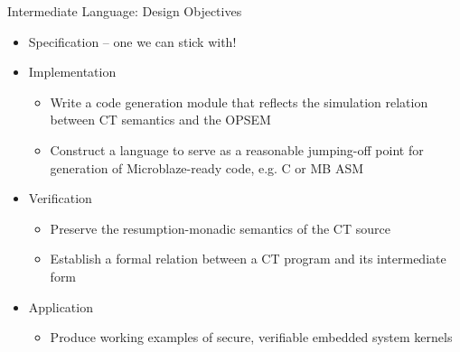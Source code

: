 \documentclass{beamer}
\begin{document}
\begin{frame}{Intermediate Language: Design Objectives}

\begin{itemize}

\item{Specification -- one we can stick with!}
  

\item{Implementation}

  \begin{itemize}
  
  \item{Write a code generation module that reflects the simulation relation between CT semantics and the OPSEM}
  
  \item{Construct a language to serve as a reasonable jumping-off point for generation of Microblaze-ready code, e.g. C or MB ASM}
    
  \end{itemize}


\item{Verification}

  \begin{itemize}
  
  \item{Preserve the resumption-monadic semantics of the CT source}
  
  \item{Establish a formal relation between a CT program and its intermediate form}
  
  \end{itemize}
  
\item{Application}
  \begin{itemize}
    \item{Produce working examples of secure, verifiable embedded system kernels}
  \end{itemize}
  
\end{itemize}


\end{frame}


\end{document}
